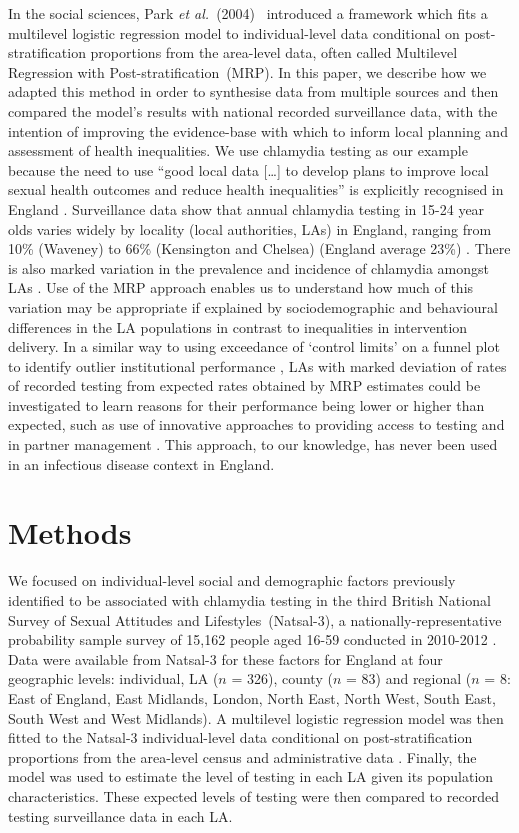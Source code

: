\documentclass[fleqn,10pt]{wlscirep}
\begin{document}
In the social sciences, Park {\it et al.}~(2004)~\cite{Park2004} introduced a framework which fits a multilevel logistic regression model to individual-level data conditional on post-stratification proportions from the area-level data, often called Multilevel Regression with Post-stratification~(MRP). In this paper, we describe how we adapted this method \cite{Park2004} in order to synthesise data from multiple sources and then compared the model’s results with national recorded surveillance data, with the intention of improving the evidence-base with which to inform local planning and assessment of health inequalities. We use chlamydia testing as our example because the need to use “good local data […] to develop plans to improve local sexual health outcomes and reduce health inequalities” is explicitly recognised in England \cite{DepartmentofHealth2013}. Surveillance data show that annual chlamydia testing in 15-24 year olds varies widely by locality (local authorities, LAs) in England, ranging from 10\% (Waveney) to 66\% (Kensington and Chelsea) (England average 23\%) \cite{fingertips}. There is also marked variation in the prevalence and incidence of chlamydia amongst LAs \cite{Lewis2017}. Use of the MRP approach enables us to understand how much of this variation may be appropriate if explained by sociodemographic and behavioural differences in the LA populations in contrast to inequalities in intervention delivery. In a similar way to using exceedance of ‘control limits’ on a funnel plot to identify outlier institutional performance \cite{Spiegelhalter2005}, LAs with marked deviation of rates of recorded testing from expected rates obtained by MRP estimates could be investigated to learn reasons for their performance being lower or higher than expected, such as use of innovative approaches to providing access to testing \cite{Estcourt2016} and in partner management \cite{Althaus2014}. This approach, to our knowledge, has never been used in an infectious disease context in England.

\section*{Methods}

We focused on individual-level social and demographic factors previously identified to be associated with chlamydia testing in the third British National Survey of Sexual Attitudes and Lifestyles~(Natsal-3), a nationally-representative probability sample survey of 15,162 people aged 16-59 conducted in 2010-2012 \cite{Erens2014,Johnson2017}. Data were available from Natsal-3 for these factors for England at four geographic levels: individual, LA ($n$ = 326), county ($n$ = 83) and regional ($n$ = 8: East of England, East Midlands, London, North East, North West, South East, South West and West Midlands). A multilevel logistic regression model was then fitted to the Natsal-3 individual-level data conditional on post-stratification proportions from the area-level census and administrative data \cite{Park2004}. Finally, the model was used to estimate the level of testing in each LA given its population characteristics. These expected levels of testing were then compared to recorded testing surveillance data in each LA.
\end{document}
